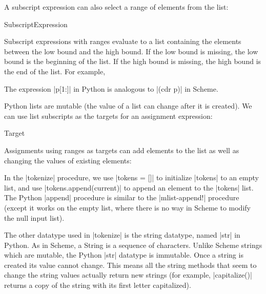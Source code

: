 A subscript expression can also select a range of elements from the list:
\begin{bnfgrammarm}{SubscriptExpression}
\end{bnfgrammarm}

Subscript expressions with ranges evaluate to a list containing the elements between the low bound and the high bound.  If the low bound is missing, the low bound is the beginning of the list.  If the high bound is missing, the high bound is the end of the list.  For example,

\begin{pythoninteracts}
\end{pythoninteracts}

The expression \pycode|p[1:]| in Python is analogous to \scheme|(cdr p)| in Scheme.

Python lists are mutable (the value of a list can change after it is created).  We can use list subscripts as the targets for an assignment expression:
\begin{bnfgrammarm}{Target}
\end{bnfgrammarm}
Assignments using ranges as targets can add elements to the list as well as changing the values of existing elements:

\begin{pythoninteracts}
\end{pythoninteracts}

In the \pycode|tokenize| procedure, we use \pycode|tokens = []| to initialize \pycode|tokens| to an empty list, and use \pycode|tokens.append(current)| to append an element to the \pycode|tokens| list.  The Python \pycode|append| procedure is similar to the \scheme|mlist-append!| procedure (except it works on the empty list, where there is no way in Scheme to modify the null input list).

 The other datatype used in \pycode|tokenize| is the string datatype, named \pycode|str| in Python.  As in Scheme, a String is a sequence of characters.  Unlike Scheme strings  which are mutable, the Python \pycode|str| datatype is immutable.  Once a string is created its value cannot change.  This means all the string methods that seem to change the string values actually return new strings (for example, \pycode|capitalize()| returns a copy of the string with its first letter capitalized). 

